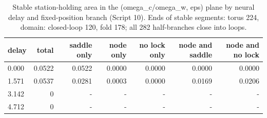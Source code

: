 \begin{table}
\caption{Stable station-holding area in the (omega\_c/omega\_w, eps) plane by neural delay and fixed-position branch (Script 10). Ends of stable segments: torus 224, domain: closed-loop 120, fold 178; all 282 half-branches close into loops.}
\label{tab:T5_continuation}
\begin{ruledtabular}
\begin{tabular}{lrrrrrr}
delay & total & saddle only & node only & no lock only & node and saddle & node and no lock \\
\hline
0.000 & 0.0522 & 0.0522 & 0.0000 & 0.0000 & 0.0000 & 0.0000 \\
1.571 & 0.0537 & 0.0281 & 0.0003 & 0.0000 & 0.0169 & 0.0206 \\
3.142 & 0 & - & - & - & - & - \\
4.712 & 0 & - & - & - & - & - \\
\end{tabular}
\end{ruledtabular}
\end{table}